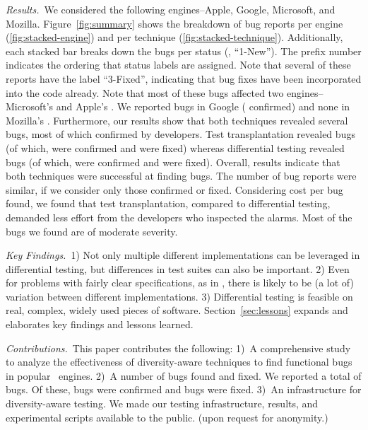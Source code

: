 \documentclass[sigconf,review, anonymous]{acmart}
\begin{document}
\emph{Results.}~We considered the following engines--Apple, Google,
Microsoft, and Mozilla. Figure~\ref{fig:summary} shows the breakdown
of bug reports per engine (\ref{fig:stacked-engine}) and per technique
(\ref{fig:stacked-technique}). Additionally, each stacked bar breaks
down the bugs per status (\eg{}, ``1-New''). The prefix number
indicates the ordering that status labels are assigned. Note that
several of these reports have the label ``3-Fixed'', indicating that
bug fixes have been incorporated into the code already. Note that most
of these bugs affected two engines--Microsoft's \chakra{} and Apple's
\jsc{}.  We reported \noBugsBugsReportedGoogle{} bugs in Google
\veight{} (\noBugsBugsConfirmedGoogle{} confirmed) and none in
Mozilla's \smonkey{}.  Furthermore, our results show that both
techniques revealed several bugs, most of which confirmed by
developers. Test transplantation revealed \noBugsTransplantation{}
bugs (of which, \noBugsTransplantationConfirmed{} were confirmed and
\noBugsTransplantationFixed{} were fixed) whereas differential testing
revealed \noBugsDifferentialTesting{} bugs (of which,
\noBugsDifferentialTestingConfirmed{} were confirmed and
\noBugsDifferentialTestingFixed{} were fixed).  Overall, results
indicate that both techniques were successful at finding bugs. The
number of bug reports were similar, if we consider only those
confirmed or fixed. Considering cost per bug found, we found that test
transplantation, compared to differential testing, demanded less
effort from the developers who inspected the alarms. Most of the bugs
we found are of moderate severity.


\emph{Key Findings.}~1) Not only multiple different implementations
can be leveraged in differential testing, but differences in test
suites can also be important. 2) Even for problems with fairly clear
specifications, as in \javascript{}, there is likely to be (a lot of)
variation between different implementations. 3) Differential testing
is feasible on real, complex, widely used pieces of
software. Section~\ref{sec:lessons} expands and elaborates key
findings and lessons learned.

\emph{Contributions.}~This paper contributes the following: 1)~A
comprehensive study to analyze the effectiveness of diversity-aware
techniques to find functional bugs in popular \javascript\ engines.
2)~A number of bugs found and fixed. We reported a total of
\totalBugsReported{} bugs. Of these, \totalBugsConfirmed{} bugs were
confirmed and \totalBugsFixed{} bugs were fixed. 3)~An infrastructure
for diversity-aware testing. We made our testing infrastructure,
results, and experimental scripts available to the public. (upon
request for anonymity.)
\end{document}
